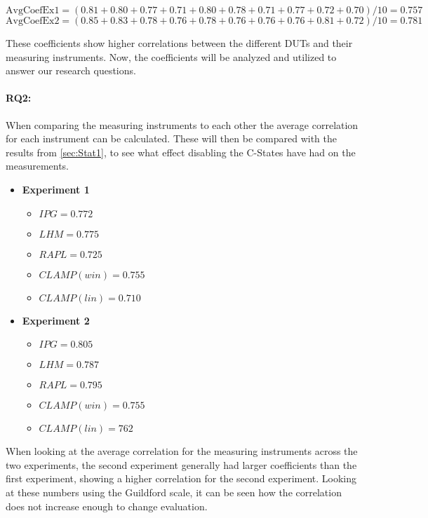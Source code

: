 $$\text{AvgCoefEx1} = (0.81+0.80+0.77+0.71+0.80+0.78+0.71+0.77+0.72+0.70)/10 = 0.757$$
$$\text{AvgCoefEx2} = (0.85+0.83+0.78+0.76+0.78+0.76+0.76+0.76+0.81+0.72)/10 = 0.781$$

These coefficients show higher correlations between the different DUTs and their measuring instruments. Now, the coefficients will be analyzed and utilized to answer our research questions. 

\paragraph{RQ2:} When comparing the measuring instruments to each other the average correlation for each instrument can be calculated. These will then be compared with the results from \cref{sec:Stat1}, to see what effect disabling the C-States have had on the measurements.

\begin{itemize}
    \item \textbf{Experiment 1}
    \begin{itemize}
        \item $IPG = 0.772$ %
        \item $LHM = 0.775$ %
        \item $RAPL = 0.725$ %
        \item $CLAMP(win) = 0.755$ %
        \item $CLAMP(lin) = 0.710$ %
    \end{itemize}
    \item \textbf{Experiment 2}
    \begin{itemize}
        \item $IPG = 0.805$ %
        \item $LHM = 0.787$ %
        \item $RAPL = 0.795$%
        \item $CLAMP(win) = 0.755$ %
        \item $CLAMP(lin) = 762$ %
    \end{itemize}
\end{itemize}

When looking at the average correlation for the measuring instruments across the two experiments, the second experiment generally had larger coefficients than the first experiment, showing a higher correlation for the second experiment. Looking at these numbers using the Guildford scale, it can be seen how the correlation does not increase enough to change evaluation.

